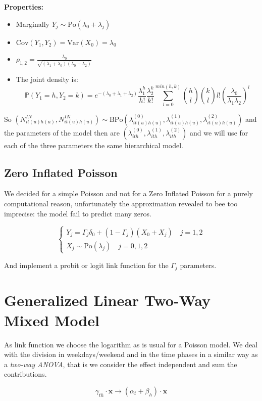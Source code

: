 \documentclass[11pt,twoside]{report}
\begin{document}
\textbf{Properties:}
\begin{itemize}
	\item Marginally $Y_j \sim \mathrm{Po}(\lambda_0 + \lambda_j)$
	\item $\mathrm{Cov}(Y_1, Y_2) = \mathrm{Var}(X_0) = \lambda_0$
	\item $\rho_{1,2} = \frac{\lambda_0}{\sqrt{(\lambda_1 + \lambda_0)(\lambda_0 + \lambda_2)}}$
	\item The joint density is:
	$$\mathbb{P}(Y_1 = h, Y_2 = k) = e^{-(\lambda_0 + \lambda_1 + \lambda_2)}\frac{\lambda_1^h}{h!}\frac{\lambda_2^k}{k!}\sum_{l = 0}^{min(h,k)}{h\choose l}{k\choose l}l!(\frac{\lambda_0}{\lambda_1\lambda_2})^l$$
\end{itemize}
So $(N^{IN}_{it(u)h(u)}, N^{IN}_{it(u)h(u)}) \sim \mathrm{BPo}(\lambda^{(0)}_{it(u)h(u)}, \lambda^{(1)}_{it(u)h(u)}, \lambda^{(2)}_{it(u)h(u)})$ and the parameters of the model then are $(\lambda^{(0)}_{ith}, \lambda^{(1)}_{ith}, \lambda^{(2)}_{ith})$ and we will use for each of the three parameters the same hierarchical model.
\subsection{Zero Inflated Poisson}
We decided for a simple Poisson and not for a Zero Inflated Poisson for a purely computational reason, unfortunately the approximation revealed to bee too imprecise: the model fail to predict many zeros.

\begin{equation}
\begin{cases}
Y_j = \Gamma_j\delta_0 + (1-\Gamma_j)(X_0 + X_j) \quad j = 1,2\\
X_j \sim \mathrm{Po}(\lambda_j) \quad j = 0,1,2 
\end{cases}
\end{equation}

And implement a probit or logit link function for the $\Gamma_j$ parameters.

\section{Generalized Linear Two-Way Mixed Model}
As link function we choose the logarithm as is usual for a Poisson model. We deal with the division in weekdays/weekend and in the time phases in a similar way as a \emph{two-way ANOVA}, that is we consider the effect independent and sum the contributions. 

$$\gamma_{th}\cdot\mathbf{x} \rightarrow (\alpha_{t} + \beta_{h})\cdot\mathbf{x}$$
\end{document}
